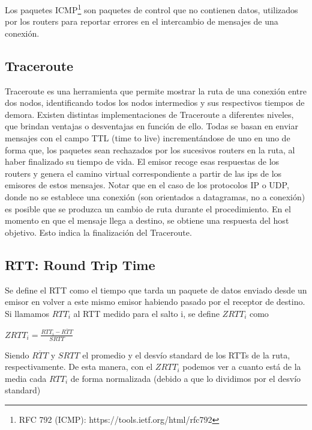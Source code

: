 Los paquetes ICMP\footnote{RFC 792 (ICMP): https://tools.ietf.org/html/rfc792} son paquetes de control que no contienen datos, utilizados por los routers para reportar errores en el intercambio de mensajes de una conexión.

\subsection{Traceroute}

Traceroute es una herramienta que permite mostrar la ruta de una conexión entre dos nodos, identificando todos los nodos intermedios y sus respectivos tiempos de demora. Existen distintas implementaciones de Traceroute a diferentes niveles, que brindan ventajas o desventajas en función de ello. Todas se basan en enviar mensajes con el campo TTL (time to live) incrementándose de uno en uno de forma que, los paquetes sean rechazados por los sucesivos routers en la ruta, al haber finalizado su tiempo de vida. El emisor recoge esas respuestas de los routers y genera el camino virtual correspondiente a partir de las ips de los emisores de estos mensajes. Notar que en el caso de los protocolos IP o UDP, donde no se establece una conexión (son orientados a datagramas, no a conexión) es posible que se produzca un cambio de ruta durante el procedimiento. En el momento en que el mensaje llega a destino, se obtiene una respuesta del host objetivo. Esto indica la finalización del Traceroute.

\subsection{RTT: Round Trip Time}

Se define el RTT como el tiempo que tarda un paquete de datos enviado desde un emisor en volver a este mismo emisor habiendo pasado por el receptor de destino.
Si llamamos $RTT_i$ al RTT medido para el salto i, se define $ZRTT_i$ como

\begin{center}
$ ZRTT_i = \frac{RTT_i-\overline{RTT}}{SRTT}$
\end{center}

Siendo $\overline{RTT}$ y $SRTT$ el promedio y el desvío standard de los RTTs de la ruta, respectivamente. De esta manera, con el $ZRTT_i$ podemos ver a cuanto está de la media cada $RTT_i$ de forma normalizada (debido a que lo dividimos por el desvío standard)


